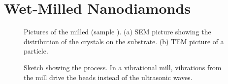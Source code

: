 \section[Wet-Milling]{Wet-Milled Nanodiamonds}\label{sec::wet_milled_nds}

	\begin{figure}[tp]
		\begin{subfigure}[t]{ 0.49\linewidth}
			\caption{}\label{subfig::sem_milled}
			\centering
		\end{subfigure}
		\hfill
		\begin{subfigure}[t]{ 0.49\linewidth}
			\caption{}\label{subfig::tem_milled}
			\centering
		\end{subfigure}
		\caption{Pictures of the milled \nds (sample \insituH). (a) SEM picture showing the distribution of the \nd crystals on the \ir substrate. (b) TEM picture of a \nd particle.}
		\label{fig::semtem_millled}
	\end{figure}

	\begin{figure}[tp]
		\centering
		\caption{Sketch showing the \basd process. In a vibrational mill, vibrations from the mill drive the beads instead of the ultrasonic waves.}
		\label{fig::sketch_basd}
	\end{figure}

